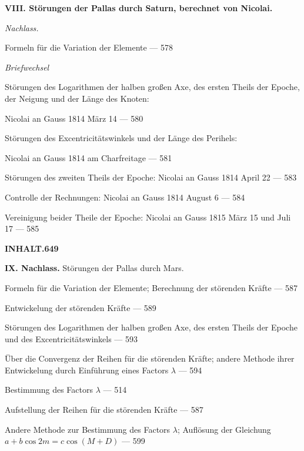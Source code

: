\documentclass[10pt,a4paper]{article}
\newenvironment{hangparas}[2]{\setlength{\hangindent}{#1}\setlength{\hangafter}{#2}}{}
\begin{document}
\vspace{0.5em}

\begin{hangparas}{1em}{1}
\noindent\textbf{VIII. Störungen der Pallas durch Saturn, berechnet von Nicolai.}

\vspace{0.2em}

\noindent\textit{Nachlass.}

\noindent Formeln für die Variation der Elemente \hfill --- 578

\noindent\textit{Briefwechsel}

\noindent Störungen des Logarithmen der halben großen Axe, des ersten Theils der Epoche, der Neigung und der Länge des Knoten:

\noindent\quad Nicolai an Gauss 1814 März 14 \hfill --- 580

\noindent Störungen des Excentricitätswinkels und der Länge des Perihels:

\noindent\quad Nicolai an Gauss 1814 am Charfreitage \hfill --- 581

\noindent Störungen des zweiten Theils der Epoche: Nicolai an Gauss 1814 April 22 \hfill --- 583

\noindent Controlle der Rechnungen: Nicolai an Gauss 1814 August 6 \hfill --- 584

\noindent Vereinigung beider Theile der Epoche: Nicolai an Gauss 1815 März 15 und Juli 17 \hfill --- 585
\end{hangparas}

\newpage

\begin{center}
\Large\textbf{INHALT.}\hfill\textbf{649}
\end{center}

\vspace{0.5em}

\begin{hangparas}{1em}{1}
\noindent\textbf{IX. Nachlass.} Störungen der Pallas durch Mars.

\vspace{0.2em}

\noindent Formeln für die Variation der Elemente; Berechnung der störenden Kräfte \hfill --- 587

\noindent Entwickelung der störenden Kräfte \hfill --- 589

\noindent Störungen des Logarithmen der halben großen Axe, des ersten Theils der Epoche und des Excentricitätswinkels \hfill --- 593

\noindent Über die Convergenz der Reihen für die störenden Kräfte; andere Methode ihrer Entwickelung durch Einführung eines Factors $\lambda$ \hfill --- 594

\noindent Bestimmung des Factors $\lambda$ \hfill --- 514

\noindent Aufstellung der Reihen für die störenden Kräfte \hfill --- 587

\noindent Andere Methode zur Bestimmung des Factors $\lambda$; Auflösung der Gleichung $a + b\cos 2m = c\cos(M + D)$ \hfill --- 599
\end{hangparas}
\end{document}
